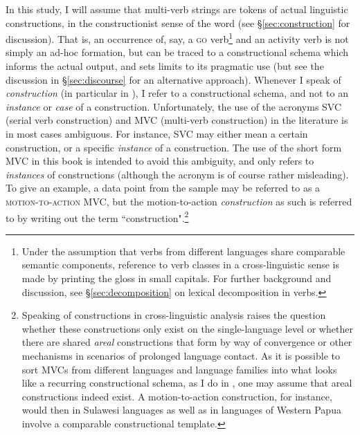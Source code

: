 In this study, I will assume that multi-verb strings are tokens of actual linguistic constructions, in the constructionist sense of the word (see §\ref{sec:construction} for discussion). That is, an occurrence of, say, a \textsc{go} verb\footnote{Under the assumption that verbs from different languages share comparable semantic components, reference to verb classes in a cross-linguistic sense is made by printing the gloss in small capitals. For further background and discussion, see §\ref{sec:decomposition} on lexical decomposition in verbs.} and an activity verb is not simply an ad-hoc formation, but can be traced to a constructional schema which informs the actual output, and sets limits to its pragmatic use (but see the discussion in §\ref{sec:discourse} for an alternative approach). Whenever I speak of \textit{construction} (in particular in ), I refer to a constructional schema, and not to an \emph{instance} or \emph{case} of a construction. Unfortunately, the use of the acronyms SVC (serial verb construction) and MVC (multi-verb construction) in the literature is in most cases ambiguous. For instance, SVC may either mean a certain construction, or a specific \emph{instance} of a construction. The use of the short form MVC in this book is intended to avoid this ambiguity, and only refers to \emph{instances} of constructions (although the acronym is of course rather misleading). To give an example, a data point from the sample may be referred to as a \textsc{motion-to-action} MVC, but the motion-to-action \emph{construction} as such is referred to by writing out the term ``construction".\footnote{Speaking of constructions in cross-linguistic analysis raises the question whether these constructions only exist on the single-language level or whether there are shared \emph{areal} constructions that form by way of convergence or other mechanisms in scenarios of prolonged language contact. As it is possible to sort MVCs from different languages and language families into what looks like a recurring constructional schema, as I do in , one may assume that areal constructions indeed exist. A motion-to-action construction, for instance, would then in Sulawesi languages as well as in languages of Western Papua involve a comparable constructional template.} 


